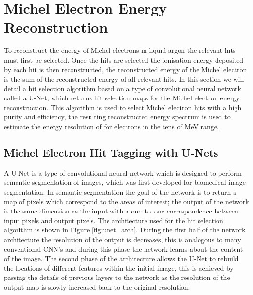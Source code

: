 \section{Michel Electron Energy Reconstruction} \label{ME_R} 

To reconstruct the energy of Michel electrons in liquid argon the relevant hits
must first be selected. Once the hits are selected the ionisation energy
deposited by each hit is then reconstructed, the reconstructed energy of the 
Michel electron is the sum of the reconstructed energy of all relevant hits. In
this section we will detail a hit selection algorithm based on a type of
convolutional neural network called a U-Net, which returns hit selection maps 
for the Michel electron energy reconstruction. This algorithm is used to select 
Michel electron hits with a high purity and efficiency, the resulting 
reconstructed energy spectrum is used to estimate the energy resolution of 
\protodune{} for electrons in the tens of MeV range.

\subsection{Michel Electron Hit Tagging with U-Nets}

A U-Net is a type of convolutional neural network which is designed to perform
semantic segmentation of images, which was first developed for biomedical image
segmentation\cite{ronneberger2015u}. In semantic segmentation the goal
of the network is to return a map of pixels which correspond to the areas of 
interest; the output of the network is the same dimension as the input with a 
one--to--one correspondence between input pixels and output pixels. The
architecture used for the hit selection algorithm is shown in Figure
\ref{fig:unet_arch}. During the first half of the network architecture the
resolution of the output is decreases, this is analogous to many conventional
CNN's and during this phase the network learns about the content of the image.
The second phase of the architecture allows the U-Net to rebuild the locations 
of different features within the initial image, this is achieved by passing 
the details of previous layers to the network as the resolution of the output 
map is slowly increased back to the original resolution.

